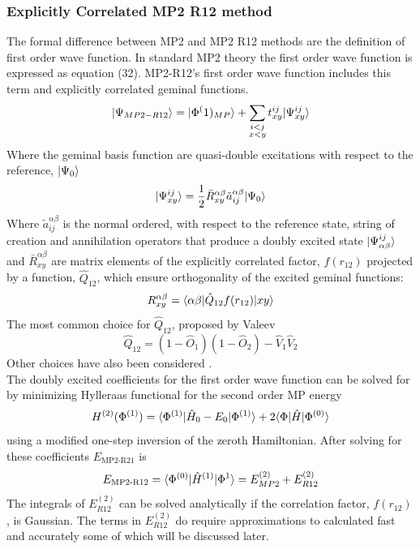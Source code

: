     \subsubsection{Explicitly Correlated MP2 R12 method}
      The formal difference between MP2 and MP2 R12 methods are the definition of first order wave function.  In standard MP2 theory the first order wave function is expressed as equation (32).  MP2-R12's first order wave function includes this term and explicitly correlated geminal functions.
        \begin{equation}
          | \Psi_{MP2-R12} \rangle = | \Phi^(1)_{MP} \rangle + \sum_{\substack{i<j \\ x<y}} t^{ij}_{xy} | \Psi^{ij}_{xy} \rangle
        \end{equation}
      Where the geminal basis function are quasi-double excitations with respect to the reference, $| \Psi_0 \rangle$
        \begin{equation}
        | \Psi^{ij}_{xy} \rangle = \frac{1}{2} \bar{R}^{\alpha \beta}_{xy} \tilde{a}^{\alpha \beta}_{i j} | \Psi_0 \rangle
        \end{equation}
      Where $\tilde{a}^{\alpha\beta}_{ij}$ is the normal ordered, with respect to the reference state, string of creation and annihilation operators that produce a doubly excited state $| \Psi^{ij}_{\alpha\beta} \rangle$ and $\bar{R}^{\alpha\beta}_{xy}$ are matrix elements of the explicitly correlated factor, $f(r_{12})$ projected by a function, $\hat{Q}_{12}$, which ensure orthogonality of the excited geminal functions:
        \begin{equation}
          R^{\alpha \beta}_{xy} = \langle\alpha \beta | \hat{Q}_{12} f(r_{12})| xy \rangle
        \end{equation}
      The most common choice for $\hat{Q}_{12}$, proposed by Valeev\cite{Valeev 2004} 
        \begin{equation}
          \hat{Q}_{12} = (1-\hat{O}_1)(1-\hat{O}_2)- \hat{V}_1 \hat{V}_2
        \end{equation}
      Other choices have also been considered \cite{wind 2002, Koppler 2002}.\\
      The doubly excited coefficients for the first order wave function can be solved for by minimizing Hylleraas functional for the second order MP energy 
        \begin{equation}
          H^{(2)} (\Phi^{(1)}) = \langle\Phi^{(1)} | \hat{H}_0 - E_0 | \Phi^{(1)} \rangle + 2 \langle\Phi |\hat{H}| \Phi^{(0)} \rangle
        \end{equation}
      using a modified one-step inversion of the zeroth Hamiltonian.  After solving for these coefficients $E_{\text{MP2-R21}}$ is 
        \begin{equation}
          E_{\text{MP2-R12}} = \langle\Phi^{(0)} | \hat{H}^{(1)} | \Phi^{1} \rangle = E^{(2)}_{MP2} + E^{(2)}_{R12}
        \end{equation}
      The integrals of $E^{(2)}_{R12}$ can be solved analytically if the correlation factor, $f(r_{12})$, is Gaussian\cite{Polly 2006}.  The terms in $E^{(2)}_{R12}$ do require approximations to calculated fast and accurately some of which will be discussed later\cite{Kong 2012}.

